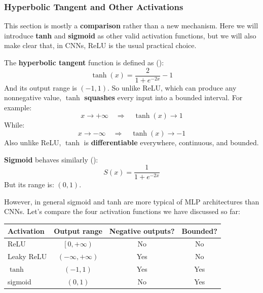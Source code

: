 \subsubsection{Hyperbolic Tangent and Other Activations}\label{sec:hyperbolic-tangent-and-other-activations-cnn}

This section is mostly a \textbf{comparison} rather than a new mechanism. Here we will introduce \textbf{tanh} and \textbf{sigmoid} as other valid activation functions, but we will also make clear that, in CNNs, ReLU is the usual practical choice.

\highspace
The \textbf{hyperbolic tangent} function is defined as ():
\begin{equation*}
    \tanh(x) = \frac{2}{1 + e^{-2x}} - 1
\end{equation*}
And its output range is $\left(-1, 1\right)$. So unlike ReLU, which can produce any nonnegative value, $\tanh$ \textbf{squashes} every input into a bounded interval. For example:
\begin{equation*}
    x \to +\infty \quad \Rightarrow \quad \tanh(x) \to 1
\end{equation*}
While:
\begin{equation*}
    x \to -\infty \quad \Rightarrow \quad \tanh(x) \to -1
\end{equation*}
Also unlike ReLU, $\tanh$ is \textbf{differentiable} everywhere, continuous, and bounded.

\highspace
\textbf{Sigmoid} behaves similarly ():
\begin{equation*}
    S(x) = \frac{1}{1 + e^{-2x}}
\end{equation*}
But its range is: $(0, 1)$.

\highspace
However, in general sigmoid and tanh are more typical of MLP architectures than CNNs. Let's compare the four activation functions we have discussed so far:

\begin{center}
    \begin{tabular}{@{} l c c c @{}}
        \toprule
        \textbf{Activation} & \textbf{Output range} & \textbf{Negative outputs?} & \textbf{Bounded?} \\
        \midrule
        ReLU        & $\left[0, +\infty\right)$         & No    & No \\
        Leaky ReLU  & $\left(-\infty, +\infty\right)$   & Yes   & No \\
        $\tanh$     & $\left(-1, 1\right)$              & Yes   & Yes \\
        sigmoid     & $\left(0, 1\right)$               & No    & Yes \\
        \bottomrule
    \end{tabular}
\end{center}


